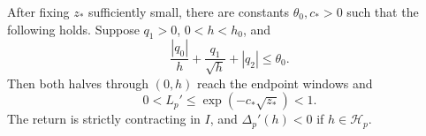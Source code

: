 \begin{lemma}
\label{lem:relative-height-paired-new}
After fixing $z_*$ sufficiently small, there are constants
$\theta_0,c_*>0$ such that the following holds.  Suppose $q_1>0$,
$0<h<h_0$, and
\begin{equation}
\label{eq:relative-height-paired-condition-new}
 \frac{|q_0|}{h}+\frac{q_1}{\sqrt h}+|q_2|\le\theta_0.
\end{equation}
Then both halves through $(0,h)$ reach the endpoint windows and
\begin{equation}
\label{eq:relative-height-local-bound-new}
 0<L_p'\le\exp(-c_*\sqrt{z_*})<1.
\end{equation}
The return is strictly contracting in $I$, and $\Delta_p'(h)<0$ if
$h\in\mathcal H_p$.
\end{lemma}

